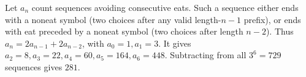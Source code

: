 Let $a_n$ count sequences avoiding consecutive eats. Such a sequence either ends with a noneat symbol (two choices after any valid length-$n-1$ prefix), or ends with eat preceded by a noneat symbol (two choices after length $n-2$). Thus $a_n=2a_{n-1}+2a_{n-2}$, with $a_0=1,a_1=3$. It gives $a_2=8,a_3=22,a_4=60,a_5=164,a_6=448$. Subtracting from all $3^6=729$ sequences gives $\boxed{281}$.
